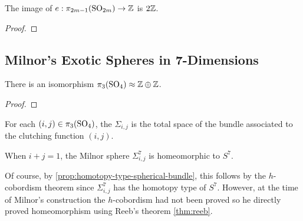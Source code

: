 \begin{corollary}\label{cor:expressible-euler-numbers-spheres}
	The image of $e : \pi_{2m-1}(\mathrm{SO}_{2m})\to\mathbb{Z}$ is $2\mathbb{Z}$.
\end{corollary}
\begin{proof}
\end{proof}

\subsection{Milnor's Exotic Spheres in 7-Dimensions}

\begin{proposition}\label{prop:3rd-homotopy-SO4}
	There is an isomorphism $\pi_3(\mathrm{SO}_4)\approx \mathbb{Z}\oplus \mathbb{Z}$.
\end{proposition}
\begin{proof}
\end{proof}

\begin{definition}
	For each $(i,j)\in \pi_3(\mathrm{SO}_4)$, the  $\Sigma_{i,j}$ is the total space of the bundle associated to the clutching function $(i,j)$.
\end{definition}

\begin{proposition}\label{prop:milnor-spheres-homeomorphic-to-spheres}
	When $i+j=1$, the Milnor sphere $\Sigma_{i,j}^7$ is homeomorphic to $S^7$.
\end{proposition}

Of course, by \cref{prop:homotopy-type-spherical-bundle}, this follows by the $h$-cobordism theorem since $\Sigma_{i,j}^7$ has the homotopy type of $S^7$. However, at the time of Milnor's construction the $h$-cobordism had not been proved so he directly proved homeomorphism using Reeb's theorem \cref{thm:reeb}.

